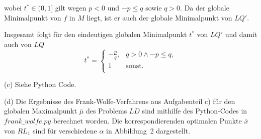 \documentclass[ngerman, a4paper,12pt]{article}
\begin{document}
wobei $t^* \in (0,1]$ gilt wegen $p<0$ und $-p\leq q$ sowie $q>0$. Da der globale Minimalpunkt von $f$ in $M$ liegt, ist er auch der globale Minimalpunkt von $LQ'$. \par
Insgesamt folgt für den eindeutigen globalen Minimalpunkt $t^*$ von $LQ'$ und damit auch von $LQ$
\begin{equation*}
	t^* = 
		\begin{cases}
		-\frac{p}{q},& q>0 \land -p \leq q,\\
		1 & \text{sonst}.\\
	\end{cases}
\end{equation*}
\par
(c) Siehe Python Code.
\par
(d) Die Ergebnisse des Frank-Wolfe-Verfahrens aus Aufgabenteil c) für den globalen Maximalpunkt $\bar{\mu}$ des Problems $LD$ sind mithilfe des Python-Codes in $frank\_wolfe.py$ berechnet worden. Die korrespondierenden optimalen Punkte $\bar{x}$ von $RL_1$ sind für verschiedene $\alpha$ in Abbildung~2 dargestellt.
\end{document}
